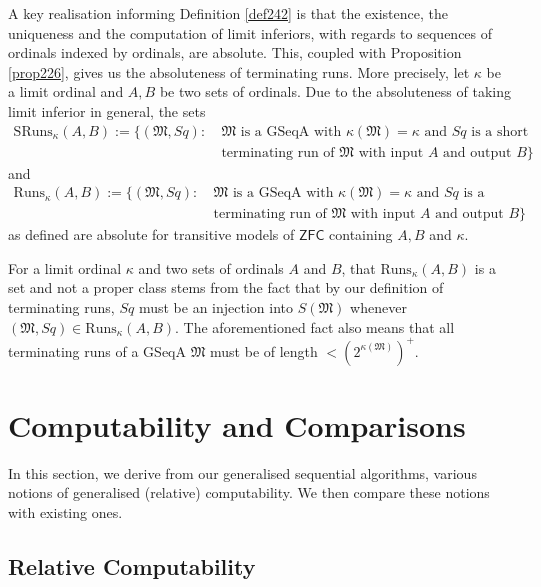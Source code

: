 \documentclass[12pt]{article}
\numberwithin{equation}{section}
\begin{document}
A key realisation informing Definition \ref{def242} is that the existence, the uniqueness and the computation of limit inferiors, with regards to sequences of ordinals indexed by ordinals, are absolute. This, coupled with Proposition \ref{prop226}, gives us the absoluteness of terminating runs. More precisely, let $\kappa$ be a limit ordinal and $A, B$ be two sets of ordinals. Due to the absoluteness of taking limit inferior in general, the sets
\begin{align*}
    \mathrm{SRuns}_{\kappa}(A, B) := \{(\mathfrak{M}, Sq) : \ & \mathfrak{M} \text{ is a GSeqA with } \kappa(\mathfrak{M}) = \kappa \text{ and } Sq \text{ is a short} \\
    & \text{terminating run of } \mathfrak{M} \text{ with input } A \text{ and output } B\}
\end{align*}
and
\begin{align*}
    \mathrm{Runs}_{\kappa}(A, B) := \{(\mathfrak{M}, Sq) : \ & \mathfrak{M} \text{ is a GSeqA with } \kappa(\mathfrak{M}) = \kappa \text{ and } Sq \text{ is a} \\
    & \text{terminating run of } \mathfrak{M} \text{ with input } A \text{ and output } B\}
\end{align*}
as defined are absolute for transitive models of $\mathsf{ZFC}$ containing $A, B$ and $\kappa$. 

\begin{rem}\label{rem243}
For a limit ordinal $\kappa$ and two sets of ordinals $A$ and $B$, that $\mathrm{Runs}_{\kappa}(A, B)$ is a set and not a proper class stems from the fact that by our definition of terminating runs, $Sq$ must be an injection into $S(\mathfrak{M})$ whenever $(\mathfrak{M}, Sq) \in \mathrm{Runs}_{\kappa}(A, B)$. The aforementioned fact also means that all terminating runs of a GSeqA $\mathfrak{M}$ must be of length $< (2^{\kappa(\mathfrak{M})})^+$.
\end{rem}

\section{Computability and Comparisons}

In this section, we derive from our generalised sequential algorithms, various notions of generalised (relative) computability. We then compare these notions with existing ones.

\subsection{Relative Computability}
\end{document}
